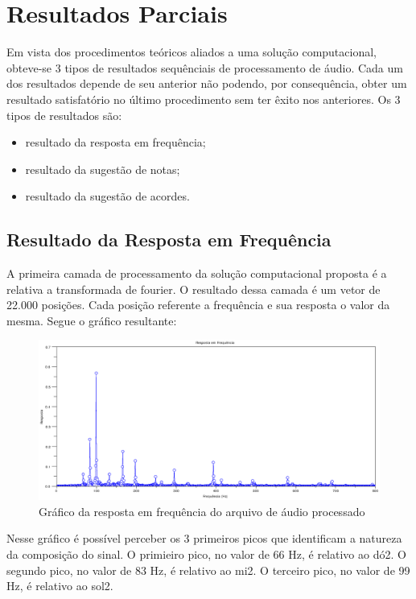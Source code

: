 \chapter{Resultados Parciais}
\label{chap:resultadosparciais}

	Em vista dos procedimentos teóricos aliados a uma solução computacional, obteve-se 3 tipos de resultados sequênciais de processamento de áudio.
	Cada um dos resultados depende de seu anterior não podendo, por consequência, obter um resultado satisfatório no último procedimento sem ter êxito nos anteriores. Os 3 tipos de resultados são:
	 \begin{itemize}
        \item resultado da resposta em frequência;
        \item resultado da sugestão de notas;
        \item resultado da sugestão de acordes.
    \end{itemize}

\section{Resultado da Resposta em Frequência}
\label{sec:resultadodarespostaemfrequencia}

A primeira camada de processamento da solução computacional proposta é a relativa a transformada de fourier. O resultado dessa camada é um vetor de 22.000 posições. Cada posição referente a frequência e sua resposta o valor da mesma.
Segue o gráfico resultante:

 \begin{figure}[h]
	\centering
		\includegraphics[keepaspectratio=true,scale=0.49]{figuras/resposta_frequencia.eps}
	\caption{Gráfico da resposta em frequência do arquivo de áudio processado}
\end{figure}

Nesse gráfico é possível perceber os 3 primeiros picos que identificam a natureza da composição do sinal. O primieiro pico, no valor de 66 Hz, é relativo ao dó2. O segundo pico, no valor de 83 Hz, é relativo ao mi2. O terceiro pico, no valor de 99 Hz, é relativo ao sol2. 

